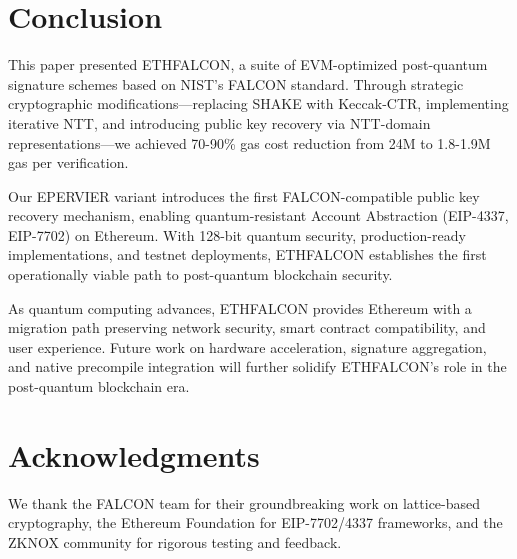 \documentclass[11pt,a4paper]{article}
\begin{document}
\section{Conclusion}

This paper presented ETHFALCON, a suite of EVM-optimized post-quantum signature schemes based on NIST's FALCON standard. Through strategic cryptographic modifications---replacing SHAKE with Keccak-CTR, implementing iterative NTT, and introducing public key recovery via NTT-domain representations---we achieved 70-90\% gas cost reduction from 24M to 1.8-1.9M gas per verification.

Our EPERVIER variant introduces the first FALCON-compatible public key recovery mechanism, enabling quantum-resistant Account Abstraction (EIP-4337, EIP-7702) on Ethereum. With 128-bit quantum security, production-ready implementations, and testnet deployments, ETHFALCON establishes the first operationally viable path to post-quantum blockchain security.

As quantum computing advances, ETHFALCON provides Ethereum with a migration path preserving network security, smart contract compatibility, and user experience. Future work on hardware acceleration, signature aggregation, and native precompile integration will further solidify ETHFALCON's role in the post-quantum blockchain era.

\section*{Acknowledgments}

We thank the FALCON team for their groundbreaking work on lattice-based cryptography, the Ethereum Foundation for EIP-7702/4337 frameworks, and the ZKNOX community for rigorous testing and feedback.
\end{document}
